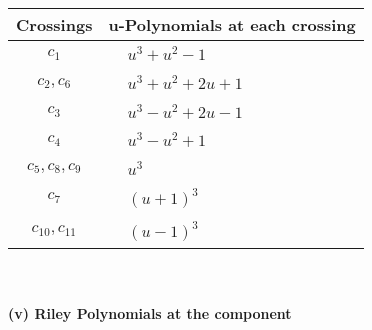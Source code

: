 \documentclass[1p]{elsarticle_modified}
\theoremstyle{definition}
\begin{document}
\begin{tabular}{m{50pt}|m{274pt}}
Crossings & \hspace{64pt}u-Polynomials at each crossing \\
\hline $$\begin{aligned}c_{1}\end{aligned}$$&$\begin{aligned}
&u^3+u^2-1
\end{aligned}$\\
\hline $$\begin{aligned}c_{2},c_{6}\end{aligned}$$&$\begin{aligned}
&u^3+u^2+2 u+1
\end{aligned}$\\
\hline $$\begin{aligned}c_{3}\end{aligned}$$&$\begin{aligned}
&u^3- u^2+2 u-1
\end{aligned}$\\
\hline $$\begin{aligned}c_{4}\end{aligned}$$&$\begin{aligned}
&u^3- u^2+1
\end{aligned}$\\
\hline $$\begin{aligned}c_{5},c_{8},c_{9}\end{aligned}$$&$\begin{aligned}
&u^3
\end{aligned}$\\
\hline $$\begin{aligned}c_{7}\end{aligned}$$&$\begin{aligned}
&(u+1)^3
\end{aligned}$\\
\hline $$\begin{aligned}c_{10},c_{11}\end{aligned}$$&$\begin{aligned}
&(u-1)^3
\end{aligned}$\\
\hline
\end{tabular}\\~\\
\newpage\renewcommand{\arraystretch}{1}
\flushleft \textbf{(v) Riley Polynomials at the component}\newline \\
\end{document}
